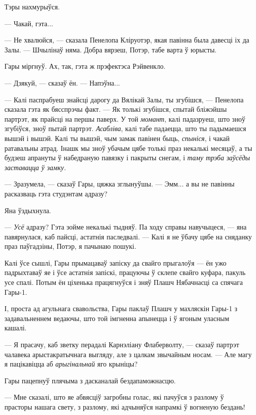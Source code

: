 Тэры нахмурыўся.

--- Чакай, гэта...

--- Не хвалюйся, --- сказала Пенелопа Кліруотэр, якая павінна была давесці іх да Залы.
--- Шчылінаў няма. Добра вярзеш, Потэр, табе варта ў юрысты.

Гары міргнуў. Ах, так, гэта ж прэфектэса Рэйвенкло.

--- Дзякуй, --- сказаў ён. --- Напэўна...

--- Калі паспрабуеш знайсці дарогу да Вялікай Залы, ты згубішся, --- Пенелопа 
сказала гэта як бясспрэчы факт. --- Як толькі згубішся, спытай бліжэйшы партрэт,
як прайсці на першы паверх. У той \emph{момант}, калі падазруеш, што зноў 
згубіўся, зноў пытай партрэт.  \emph{Асабліва}, калі табе падаецца, што ты падымаешся
вышэй і вышэй. Калі ты вышэй, чым замак павінен быць, \emph{спыніся}, і чакай
ратавальны атрад. Інашк мы зноў убачым цябе толькі праз некалькі месяцаў, а ты 
будзеш апрануты ў набедраную павязку і пакрыты снегам, і \emph{таму
трэба заўсёды заставацца ў замку.}

--- Зразумела, --- сказаў Гары, цяжка зглынуўшы. --- Эмм... а вы не павінны расказваць 
гэта студэнтам адразу?

Яна ўздыхнула.

---  \emph{Усё} адразу? Гэта зойме некалькі тыдняў. Па ходу справы навучыцеся, --- 
яна павярнулася, каб пайсці, астатнія паследвалі. --- Калі я не ўбачу цябе 
на сняданку праз паўгадзіны, Потэр, я пачынаю пошукі.

Калі ўсе сышлі, Гары прымацаваў запіску да свайго прыгалоўя --- ён ужо падрыхтаваў яе
і ўсе астатнія запіскі, працуючы ў склепе свайго куфара, пакуль усе спалі. Потым ён 
ціхенька працягнуўся і зняў Плашч Нябачнасці са спячага Гары-1.

І, проста ад агульнага свавольства, Гары паклаў Плашч у махляскін Гары-1 з задавальненнем
ведаючы, што той імгненна апынецца і ў ягоным уласным кашалі.

\later

--- Я прасачу, каб зветку перадалі Карнэліану Флаберволту, --- сказаў партрэт 
чалавека арыстакратычнага выгляду, але з цалкам звычайным носам. --- Але 
магу я пацікавіцца аб \emph{арыгінальнай} яго крыніцы?

Гары пацепнуў плячыма з дасканалай бездапаможнасцю. 

--- Мне сказалі, што яе абвясціў загробны голас, які пачуўся з разлому ў прасторы нашага свету,
з разлому, які адчыняўся напрамкі ў вогненую бездань!


